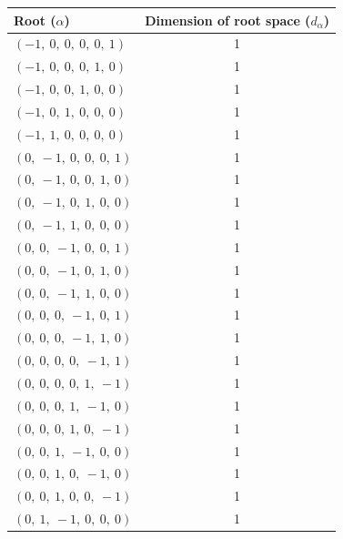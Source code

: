 \documentclass[11pt]{article}
\theoremstyle{definition}
\begin{document}
\noindent \begin{tabular}{|l|c|}
    \hline
    \textbf{Root ($\alpha$)} & \textbf{Dimension of root space ($d_{\alpha}$)} \\
    \hline
    $\left( -1, \  0, \  0, \  0, \  0, \  1\right)$ & 1 \\
    \hline
    $\left( -1, \  0, \  0, \  0, \  1, \  0\right)$ & 1 \\
    \hline
    $\left( -1, \  0, \  0, \  1, \  0, \  0\right)$ & 1 \\
    \hline
    $\left( -1, \  0, \  1, \  0, \  0, \  0\right)$ & 1 \\
    \hline
    $\left( -1, \  1, \  0, \  0, \  0, \  0\right)$ & 1 \\
    \hline
    $\left( 0, \  -1, \  0, \  0, \  0, \  1\right)$ & 1 \\
    \hline
    $\left( 0, \  -1, \  0, \  0, \  1, \  0\right)$ & 1 \\
    \hline
    $\left( 0, \  -1, \  0, \  1, \  0, \  0\right)$ & 1 \\
    \hline
    $\left( 0, \  -1, \  1, \  0, \  0, \  0\right)$ & 1 \\
    \hline
    $\left( 0, \  0, \  -1, \  0, \  0, \  1\right)$ & 1 \\
    \hline
    $\left( 0, \  0, \  -1, \  0, \  1, \  0\right)$ & 1 \\
    \hline
    $\left( 0, \  0, \  -1, \  1, \  0, \  0\right)$ & 1 \\
    \hline
    $\left( 0, \  0, \  0, \  -1, \  0, \  1\right)$ & 1 \\
    \hline
    $\left( 0, \  0, \  0, \  -1, \  1, \  0\right)$ & 1 \\
    \hline
    $\left( 0, \  0, \  0, \  0, \  -1, \  1\right)$ & 1 \\
    \hline
    $\left( 0, \  0, \  0, \  0, \  1, \  -1\right)$ & 1 \\
    \hline
    $\left( 0, \  0, \  0, \  1, \  -1, \  0\right)$ & 1 \\
    \hline
    $\left( 0, \  0, \  0, \  1, \  0, \  -1\right)$ & 1 \\
    \hline
    $\left( 0, \  0, \  1, \  -1, \  0, \  0\right)$ & 1 \\
    \hline
    $\left( 0, \  0, \  1, \  0, \  -1, \  0\right)$ & 1 \\
    \hline
    $\left( 0, \  0, \  1, \  0, \  0, \  -1\right)$ & 1 \\
    \hline
    $\left( 0, \  1, \  -1, \  0, \  0, \  0\right)$ & 1 \\

\end{tabular}
\end{document}
